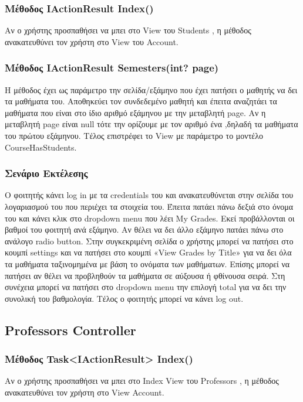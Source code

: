 \documentclass[12pt]{article}
\begin{document}
	\subsubsection{Μέθοδος IActionResult Index()}
	Αν ο χρήστης προσπαθήσει να μπει στο View του Students , η μέθοδος ανακατευθύνει τον χρήστη στο View του Account.
	
	\subsubsection{Μέθοδος IActionResult Semesters(int? page)}
	Η μέθοδος έχει ως παράμετρο την σελίδα/εξάμηνο που έχει πατήσει ο μαθητής να δει τα μαθήματα του. Αποθηκεύει τον συνδεδεμένο μαθητή και έπειτα αναζητάει τα μαθήματα που είναι στο ίδιο αριθμό εξάμηνου με την μεταβλητή page. Αν η μεταβλητή page είναι null τότε την ορίζουμε με τον αριθμό ένα ,δηλαδή τα μαθήματα του πρώτου εξάμηνου. Τέλος επιστρέφει το View με παράμετρο το μοντέλο CourseHasStudents.
	
	\subsubsection{Σενάριο Εκτέλεσης}
	Ο φοιτητής κάνει log in με τα credentials του και ανακατευθύνεται στην σελίδα του λογαριασμού του που περιέχει τα στοιχεία του. Έπειτα πατάει πάνω δεξιά στο όνομα του και κάνει κλικ στο  dropdown menu που λέει My Grades. Εκεί προβάλλονται οι βαθμοί του φοιτητή ανά εξάμηνο.  Αν θέλει να δει άλλο εξάμηνο πατάει πάνω στο ανάλογο radio button. Στην συγκεκριμένη σελίδα ο χρήστης μπορεί να πατήσει στο κουμπί settings και να πατήσει στο κουμπί «View Grades by Title» για να δει όλα τα μαθήματα ταξινομημένα με βάση το ονόματα των μαθήματων. Επίσης μπορεί να πατήσει αν θέλει να προβληθούν τα μαθήματα σε αύξουσα ή φθίνουσα σειρά. Στη συνέχεια μπορεί να πατήσει στο dropdown menu την επιλογή total για να δει την συνολική του βαθμολογία. Τέλος ο φοιτητής μπορεί να κάνει log out.
	
	\subsection{Professors Controller}
	
	\subsubsection{Μέθοδος Task<IActionResult> Index()}
	Αν ο χρήστης προσπαθήσει να μπει στο Index View του Professors , η μέθοδος ανακατευθύνει τον χρήστη στο View Account.
	
\end{document}
